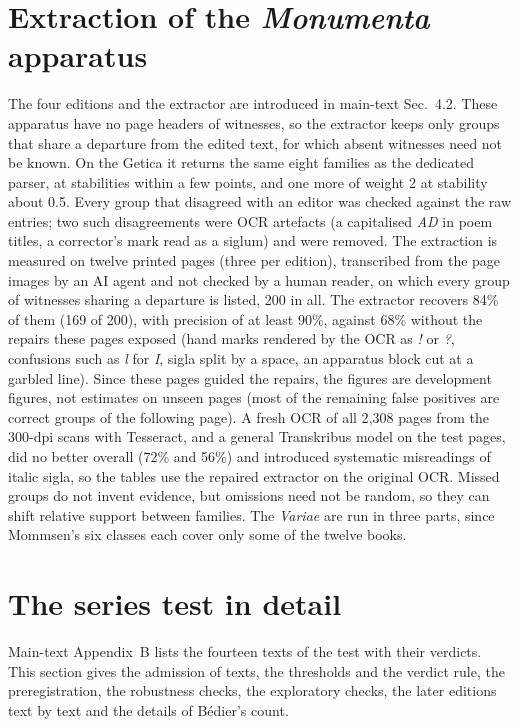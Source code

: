 \documentclass[11pt,a4paper]{article}
\theoremstyle{remark}
\begin{document}
\section{Extraction of the \emph{Monumenta} apparatus}
\label{app:extraction}
The four editions and the extractor are introduced in main-text Sec.~4.2. These apparatus have no page headers of witnesses, so the extractor keeps only groups that share a departure from the edited text, for which absent witnesses need not be known. On the Getica it returns the same eight families as the dedicated parser, at stabilities within a few points, and one more of weight 2 at stability about 0.5. Every group that disagreed with an editor was checked against the raw entries; two such disagreements were OCR artefacts (a capitalised \emph{AD} in poem titles, a corrector's mark read as a siglum) and were removed. The extraction is measured on twelve printed pages (three per edition), transcribed from the page images by an AI agent and not checked by a human reader, on which every group of witnesses sharing a departure is listed, 200 in all. The extractor recovers 84\% of them (169 of 200), with precision of at least 90\%, against 68\% without the repairs these pages exposed (hand marks rendered by the OCR as \emph{!} or \emph{?}, confusions such as \emph{l} for \emph{I}, sigla split by a space, an apparatus block cut at a garbled line). Since these pages guided the repairs, the figures are development figures, not estimates on unseen pages (most of the remaining false positives are correct groups of the following page). A fresh OCR of all 2{,}308 pages from the 300-dpi scans with Tesseract, and a general Transkribus model on the test pages, did no better overall (72\% and 56\%) and introduced systematic misreadings of italic sigla, so the tables use the repaired extractor on the original OCR. Missed groups do not invent evidence, but omissions need not be random, so they can shift relative support between families. The \emph{Variae} are run in three parts, since Mommsen's six classes each cover only some of the twelve books.

\section{The series test in detail}
\label{app:series}
Main-text Appendix~B lists the fourteen texts of the test with their verdicts. This section gives the admission of texts, the thresholds and the verdict rule, the preregistration, the robustness checks, the exploratory checks, the later editions text by text and the details of Bédier's count.
\end{document}
